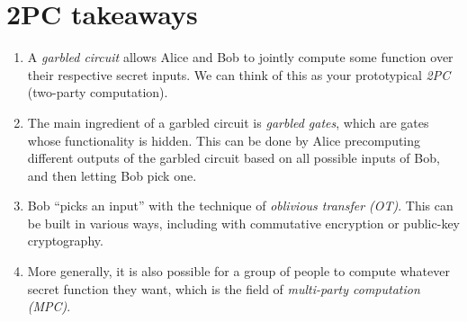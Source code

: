 \section{2PC takeaways}
\begin{tcolorbox}[takeaways]
\begin{enumerate}
\item
  A \emph{garbled circuit} allows Alice and Bob to jointly compute some
  function over their respective secret inputs. We can think of this as
  your prototypical \emph{2PC} (two-party computation).
\item
  The main ingredient of a garbled circuit is \emph{garbled gates},
  which are gates whose functionality is hidden. This can be done by
  Alice precomputing different outputs of the garbled circuit based on
  all possible inputs of Bob, and then letting Bob pick one.
\item
  Bob ``picks an input'' with the technique of \emph{oblivious transfer
  (OT)}. This can be built in various ways, including with commutative
  encryption or public-key cryptography.
\item
  More generally, it is also possible for a group of people to compute
  whatever secret function they want, which is the field of
  \emph{multi-party computation (MPC)}.
\end{enumerate}
\end{tcolorbox}
